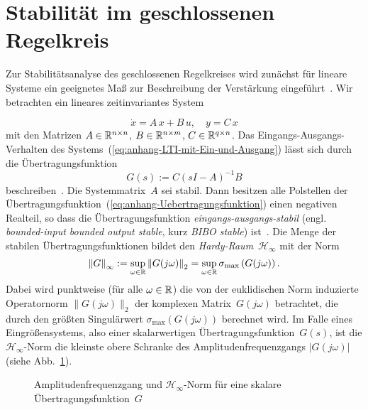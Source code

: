 \section{Stabilität im geschlossenen Regelkreis\label{sec:Stabilitaet-im-geschlossenen-Regelkreis}}

Zur Stabilitätsanalyse des geschlossenen Regelkreises wird zunächst
für lineare Systeme ein geeignetes Maß zur Beschreibung der Verstärkung
eingeführt~\cite{doyle1990,zhou1998}. Wir betrachten ein lineares
zeit\-invariantes System

\begin{equation}
\dot{x}=A\,x+B\,u,\quad y=C\,x\label{eq:anhang-LTI-mit-Ein-und-Ausgang}
\end{equation}
mit den Matrizen $A\in{\mathbb{R}}^{n\times n}$, $B\in{\mathbb{R}}^{n\times m}$, $C\in{\mathbb{R}}^{q\times n}$.
Das Eingangs-Ausgangs-Verhalten des Systems~(\ref{eq:anhang-LTI-mit-Ein-und-Ausgang})
lässt sich durch die Übertragungsfunktion 
\begin{equation}
G(s):=C\left(sI-A\right)^{-1}B\label{eq:anhang-Uebertragungsfunktion}
\end{equation}
beschreiben~\cite{lunze2007}. Die Systemmatrix~$A$ sei stabil.
Dann besitzen alle Polstellen der Übertragungsfunktion~(\ref{eq:anhang-Uebertragungsfunktion})
einen negativen Real\-teil, so dass die Übertragungsfunktion \emph{eingangs-ausgangs-stabil}
(engl. \emph{bounded-input bounded output stable}, kurz \emph{BIBO
stable}) ist~\cite{lunze2007,reinschke2014buch}. Die Menge der stabilen
Übertragungsfunktionen bildet den \emph{Hardy-Raum}~$\mathcal{H}_{\infty}$
mit der Norm
\begin{equation}
\left\Vert G\right\Vert _{\infty}:=\sup_{\omega\in{\mathbb{R}}}\left\Vert G(j\omega)\right\Vert _{2}=\sup_{\omega\in{\mathbb{R}}}\sigma_{\max}\left(G(j\omega)\right).\label{eq:anhang-hinf}
\end{equation}
Dabei wird punktweise (für alle $\omega\in{\mathbb{R}}$) die von der euklidischen
Norm induzierte Operatornorm $\|G(j\omega)\|_{2}$ der komplexen Matrix~$G(j\omega)$
betrachtet, die durch den größten Singulärwert $\sigma_{\max}(G(j\omega))$
berechnet wird. Im Falle eines Eingrößensystems, also einer skalarwertigen
Übertragungsfunktion~$G(s)$, ist die $\mathcal{H}_{\infty}$-Norm
die kleinste obere Schranke des Amplitudenfrequenzgangs $|G(j\omega)|$
(siehe Abb.~\ref{fig:Norm-Amplitudenfrequenzgang}).

\begin{figure}
\begin{centering}
\resizebox{0.6\textwidth}{!}{}
\par\end{centering}
\caption{Amplitudenfrequenzgang und $\mathcal{H}_{\infty}$-Norm für eine skalare
Übertragungsfunktion~$G$\label{fig:Norm-Amplitudenfrequenzgang}}
\end{figure}


